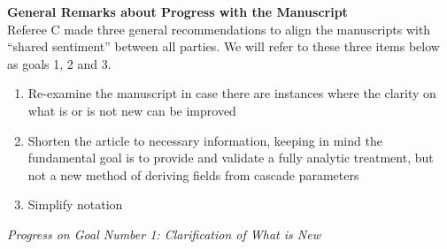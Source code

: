 \documentclass[12pt]{article}
\begin{document}
\textbf{General Remarks about Progress with the Manuscript} \\

Referee C made three general recommendations to align the manuscripts with ``shared sentiment'' between all parties.  We will refer to these three items below as goals 1, 2 and 3.

\begin{enumerate}
\item Re-examine the manuscript in case there are instances where the clarity on what is or is not new can be improved
\item Shorten the article to necessary information, keeping in mind the fundamental goal is to provide and validate a fully analytic treatment, but not a new method of deriving fields from cascade parameters
\item Simplify notation
\end{enumerate}

\textit{Progress on Goal Number 1: Clarification of What is New}
\end{document}

